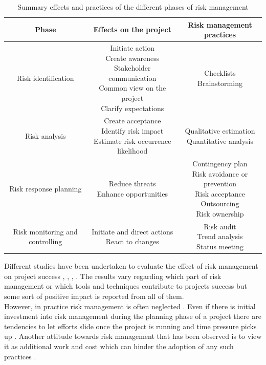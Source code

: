 \begin{table}[H]
	\centering
	\caption{Summary effects and practices of the different phases of risk management}
\begin{tabular}{c|c|c} \toprule 
Phase  & Effects on the project & Risk management practices \\ \midrule
 Risk identification & 
 \makecell{Initiate action\\
 	Create awareness\\
 	Stakeholder communication\\
 	Common view on the project\\
 	Clarify expectations}&
 \makecell{Checklists\\
 	Brainstorming}\\
 Risk analysis &
 \makecell{Create acceptance \\
 	Identify risk impact\\
 	Estimate risk occurrence likelihood }&
 \makecell{Qualitative estimation\\
 	Quantitative analysis}\\ \hline
 Risk response planning &
 \makecell{Reduce threats\\
 	Enhance opportunities }&
 \makecell{Contingency plan\\
 	Risk avoidance or prevention\\
 	Risk acceptance\\
 	Outsourcing\\
 	Risk ownership }\\ \hline
 Risk monitoring and controlling &
 \makecell{Initiate and direct actions\\
 	React to changes }&
 \makecell{Risk audit\\
 	Trend analysis\\
 	Status meeting 	
 } \bottomrule
	\end{tabular}
	\label{tab:riskmanagemensummery}
\end{table}
Different studies have been undertaken to evaluate the effect of risk management on project success \cite{debakkerDoesRiskManagement2010}, \cite{didragaRoleEffectsRisk2013}, \cite{kwakProjectRiskManagement2004}, \cite{juniorUnderstandingImpactProject2013}. The results vary regarding which part of risk management or which tools and techniques contribute to projects success but some sort of positive impact is reported from all of them. \\
However, in practice risk management is often neglected \cite{kwakProjectRiskManagement2004}. Even if there is initial investment into risk management during the planning phase of a project there are tendencies to let efforts slide once the project is running and time pressure picks up \cite{peixotoProjectRiskManagement2014}. Another attitude towards risk management that has been observed is to view it as additional work and cost which can hinder the adoption of any such practices \cite{teschITProjectRisk2007}.\\

